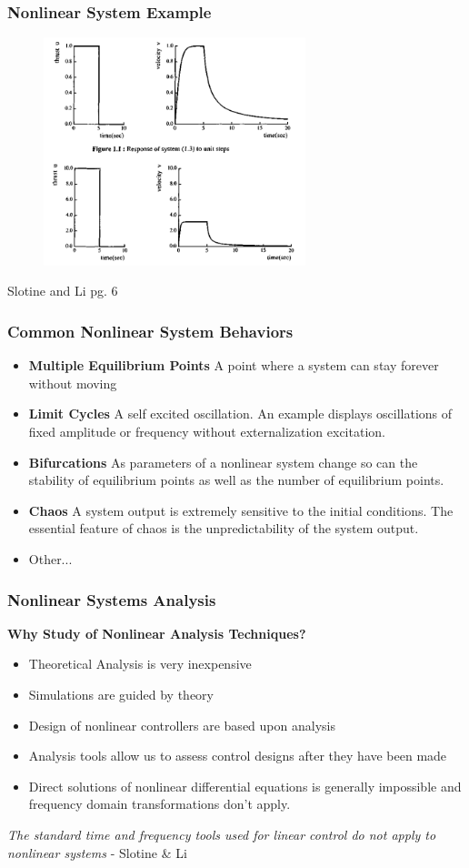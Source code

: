 \documentclass[show notes]{beamer}       %
\begin{document}
\begin{frame}
\frametitle{Nonlinear System Example}
\begin{figure}
\centering
\includegraphics[width = 3in]{NonLinearExample_1.PNG}
\end{figure}
Slotine and Li pg. 6
\end{frame}

\begin{frame}
\frametitle{Common Nonlinear System Behaviors}

\begin{itemize}
\item \textbf{Multiple Equilibrium Points} A point where a system can stay forever without moving
\item \textbf{Limit Cycles} A self excited oscillation. An example displays oscillations of fixed amplitude or frequency without externalization excitation.
\item \textbf{Bifurcations} As parameters of a nonlinear system change so can the stability of equilibrium points as well as the number of equilibrium points.
\item \textbf{Chaos} A system output is extremely sensitive to the initial conditions. The essential feature of chaos is the unpredictability of the system output.
\item Other...
\end{itemize}
\end{frame}


\begin{frame}
\frametitle{Nonlinear Systems Analysis}
\textbf{Why Study of Nonlinear Analysis Techniques?}
\begin{itemize}
\item Theoretical Analysis is very inexpensive
\item Simulations are guided by theory
\item Design of nonlinear controllers are based upon analysis
\item Analysis tools allow us to assess control designs after they have been made
\item Direct solutions of nonlinear differential equations is generally impossible and frequency domain transformations don't apply.
\end{itemize}
\Large{\textit{The standard time and frequency tools used for linear control do not apply to nonlinear systems} - Slotine \& Li}
\end{frame}
\end{document}
